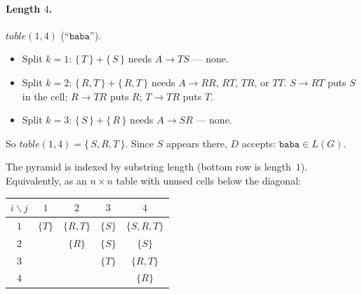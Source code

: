 \begin{soln}
\paragraph{Length $4$.}
$table(1,4)$ (``$\mathtt{baba}$'').
\begin{itemize}
\item Split $k=1$: $\{\,T\,\}+\{\,S\,\}$ needs $A\to TS$ --- none.
\item Split $k=2$: $\{\,R,T\,\}+\{\,R,T\,\}$ needs $A\to RR$, $RT$, $TR$, or $TT$.
$S\to RT$ puts $S$ in the cell; $R\to TR$ puts $R$; $T\to TR$ puts $T$.
\item Split $k=3$: $\{\,S\,\}+\{\,R\,\}$ needs $A\to SR$ --- none.
\end{itemize}
So $table(1,4)=\{\,S,R,T\,\}$. Since $S$ appears there, $D$ accepts: $\mathtt{baba}\in L(G)$.

\begin{center}
\end{center}
The pyramid is indexed by substring length (bottom row is length~$1$). Equivalently, as an $n\times n$ table with unused cells below the diagonal:

\begin{center}
\begin{tabular}{@{}c|cccc@{}}
$i\backslash j$ & $1$ & $2$ & $3$ & $4$ \\
\midrule
$1$ & $\{T\}$ & $\{R,T\}$ & $\{S\}$ & $\{S,R,T\}$ \\
$2$ & & $\{R\}$ & $\{S\}$ & $\{S\}$ \\
$3$ & & & $\{T\}$ & $\{R,T\}$ \\
$4$ & & & & $\{R\}$ \\
\end{tabular}
\end{center}
\end{soln}

